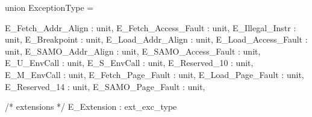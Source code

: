 union ExceptionType = {
 E_Fetch_Addr_Align   : unit,
 E_Fetch_Access_Fault : unit,
 E_Illegal_Instr      : unit,
 E_Breakpoint         : unit,
 E_Load_Addr_Align    : unit,
 E_Load_Access_Fault  : unit,
 E_SAMO_Addr_Align    : unit,
 E_SAMO_Access_Fault  : unit,
 E_U_EnvCall          : unit,
 E_S_EnvCall          : unit,
 E_Reserved_10        : unit,
 E_M_EnvCall          : unit,
 E_Fetch_Page_Fault   : unit,
 E_Load_Page_Fault    : unit,
 E_Reserved_14        : unit,
 E_SAMO_Page_Fault    : unit,

 /* extensions */
 E_Extension          : ext_exc_type
}
